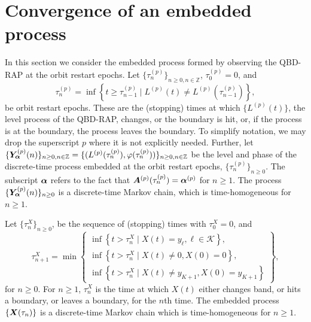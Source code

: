 
\section{Convergence of an embedded process}\label{sec: embedded}


In this section we consider the embedded process formed by observing the QBD-RAP at the orbit restart epochs. Let \(\{\tau_n^{(p)}\}_{n\geq 0, n \in \mathbb Z}\), \(\tau_0^{(p)}=0\), and
\[\tau_{n}^{(p)} = \inf\left\{t\geq \tau_{n-1}^{(p)} \mid L^{(p)}(t)\neq L^{(p)}(\tau_{n-1}^{(p)})\right\},\]
be orbit restart epochs. These are the (stopping) times at which \(\{L^{(p)}(t)\}\), the level process of the QBD-RAP, changes, or the boundary is hit, or, if the process is at the boundary, the process leaves the boundary. To simplify notation, we may drop the superscript \(p\) where it is not explicitly needed. Further, let \(\{\bm{Y}_{\bm{\alpha}}^{(p)}(n)\}_{n\geq 0, n \in \mathbb Z} = \{(L^{(p)}(\tau_n^{(p)}),\varphi(\tau_n^{(p)}))\}_{n\geq 0, n \in \mathbb Z}\) be the level and phase of the discrete-time process embedded at the orbit restart epochs, \(\{\tau_n^{(p)}\}_{n\geq 0}\). The subscript \(\boldsymbol \alpha \) refers to the fact that \(\boldsymbol A^{(p)}(\tau_n^{(p)})=\boldsymbol \alpha^{(p)}\) for \(n\geq 1\). The process \(\{\bm{Y}_{\bm{\alpha}}^{(p)}(n)\}_{n\geq 0}\) is a discrete-time Markov chain, which is time-homogeneous for \(n\geq 1\). 

Let \(\{\tau_n^X\}_{n\geq 0}\), be the sequence of (stopping) times with \(\tau_0^X=0\), and 
\[\tau_{n+1}^X = \min\left\{\begin{array}{c}\inf\left\{t>\tau_n^X\mid X(t)=y_{\ell}, \ell\in\mathcal K\right\}, \\ \inf\left\{t>\tau_n^X \mid X(t) \neq 0, X(0)=0\right\}, \\ \inf\left\{t>\tau_n^X \mid X(t) \neq y_{K+1}, X(0)=y_{K+1}\right\} \end{array} \right\},\]
for \(n\geq 0\). For \(n\geq 1\), \(\tau_n^X\) is the time at which \(X(t)\) either changes band, or hits a boundary, or leaves a boundary, for the \(n\)th time. The embedded process \(\{\boldsymbol X(\tau_n)\}\) is a discrete-time Markov chain which is time-homogeneous for \(n\geq 1\). 

